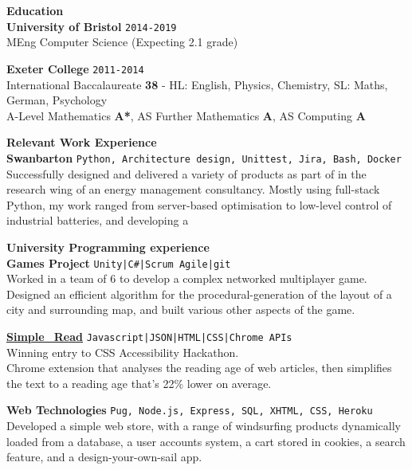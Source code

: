 \documentclass[10pt]{article}
\newcommand{\bold}[1]{\textbf{\textcolor{dark}{#1}}}
\newcommand{\sect}[1]{{\LARGE\bold{#1}}\vspace{0.2em}\\}
\newcommand{\zz}[3]{{\large\bold{#1}} \hfill {\small \colorbox{light}{\texttt{#3}}}\\{#2}\vspace{0.5em}}
\newcommand{\li}{\textcolor{mid}{|}}
\begin{document}
\begin{minipage}[t]{0.66\textwidth}
%
%
\sect{Education}
\zz{University of Bristol}
{MEng Computer Science \small{(Expecting 2.1 grade)}}{2014-2019}

\zz{Exeter College}
{International Baccalaureate \bold{38} {\scriptsize - HL: English, Physics, Chemistry, SL: Maths, German, Psychology}\\
A-Level Mathematics \bold{A*}, 
AS Further Mathematics \bold{A}, AS Computing \bold{A}}{2011-2014}






\vspace{0.5em}

\sect{Relevant Work Experience}
\zz{Swanbarton}
{Successfully designed and delivered a variety of products as part of in the research wing of an energy management consultancy. Mostly using full-stack Python, my work ranged from server-based optimisation to low-level control of industrial batteries, and developing a }
{Python, Architecture design, Unittest, Jira, Bash, Docker}



\raggedright
\sect{University Programming experience}

\zz{Games Project}
{Worked in a team of 6 to develop a complex networked multiplayer game.\\
Designed an efficient algorithm for the procedural-generation of the layout of a city and surrounding map, and built various other aspects of the game.}
{Unity\li C\#\li Scrum Agile\li git}

\zz{\href{https://lukestorry.co.uk/simple_read/}{Simple\_Read}}
{Winning entry to CSS Accessibility Hackathon.\\
Chrome extension that analyses the reading age of web articles, then simplifies the text to a reading age that's 22\% lower on average.}{Javascript\li JSON\li HTML\li CSS\li Chrome APIs}

\zz{Web Technologies}
{Developed a simple web store, with a range of windsurfing products dynamically loaded from a database, a  user accounts system, a cart stored in cookies, a search feature, and a design-your-own-sail app.}
{Pug, Node.js, Express, SQL, XHTML, CSS, Heroku}



\end{minipage}
\end{document}
